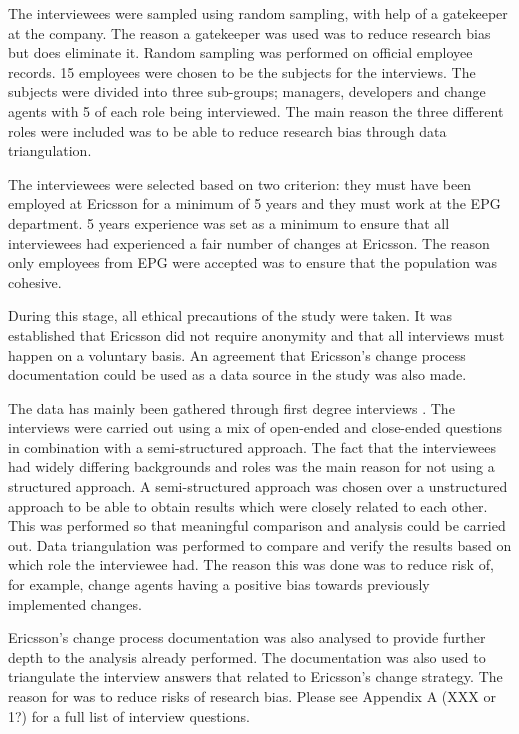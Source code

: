 \documentclass[10pt,twocolumn]{article}
\begin{document}
The interviewees were sampled using random sampling, with help of a gatekeeper at the company. The reason a gatekeeper was used was to reduce research bias but does eliminate it. Random sampling was performed on official employee records. 15 employees were chosen to be the subjects for the interviews. The subjects were divided into three sub-groups; managers, developers and change agents with 5 of each role being interviewed. The main reason the three different roles were included was to be able to reduce research bias through data triangulation.

The interviewees were selected based on two criterion: they must have been employed at Ericsson for a minimum of 5 years and they must work at the EPG department. 5 years experience was set as a minimum to ensure that all interviewees had experienced a fair number of changes at Ericsson. The reason only employees from EPG were accepted was to ensure that the population was cohesive. 

During this stage, all ethical precautions of the study were taken. It was established that Ericsson did not require anonymity and that all interviews must happen on a voluntary basis. An agreement that Ericsson's change process documentation could be used as a data source in the study was also made. 

The data has mainly been gathered through first degree interviews \cite{lethbridge2005studying}. The interviews were carried out using a mix of open-ended and close-ended questions in combination with a semi-structured approach. The fact that the interviewees had widely differing backgrounds and roles was the main reason for not using a structured approach. A semi-structured approach was chosen over a unstructured approach to be able to obtain results which were closely related to each other. This was performed so that meaningful comparison and analysis could be carried out. Data triangulation was performed to compare and verify the results based on which role the interviewee had. The reason this was done was to reduce risk of, for example, change agents having a positive bias towards previously implemented changes. 

Ericsson's change process documentation was also analysed to provide further depth to the analysis already performed. The documentation was also used to triangulate the interview answers that related to Ericsson's change strategy. The reason for was to reduce risks of research bias. Please see Appendix A (XXX or 1?) for a full list of interview questions.
\end{document}
